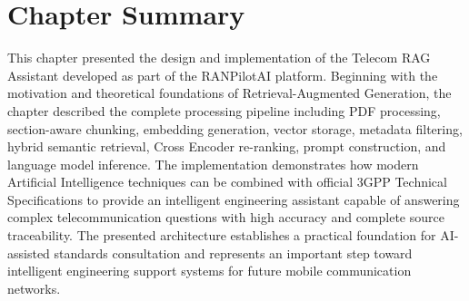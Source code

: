 \section{Chapter Summary}

This chapter presented the design and implementation of the Telecom RAG Assistant developed as part of the RANPilotAI platform. Beginning with the motivation and theoretical foundations of Retrieval-Augmented Generation, the chapter described the complete processing pipeline including PDF processing, section-aware chunking, embedding generation, vector storage, metadata filtering, hybrid semantic retrieval, Cross Encoder re-ranking, prompt construction, and language model inference.
The implementation demonstrates how modern Artificial Intelligence techniques can be combined with official 3GPP Technical Specifications to provide an intelligent engineering assistant capable of answering complex telecommunication questions with high accuracy and complete source traceability. The presented architecture establishes a practical foundation for AI-assisted standards consultation and represents an important step toward intelligent engineering support systems for future mobile communication networks.
